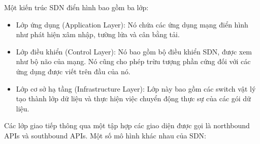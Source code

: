 \documentclass[a4paper]{article}
\begin{document}
Một kiến trúc SDN điển hình bao gồm ba lớp:
\begin{itemize}
    \item Lớp ứng dụng (Application Layer): Nó chứa các ứng dụng mạng điển hình như phát hiện xâm nhập, tường lửa và cân bằng tải.
    \item Lớp điều khiển (Control Layer): Nó bao gồm bộ điều khiển SDN, được xem như bộ não của mạng. Nó cũng cho phép trừu tượng phần cứng đối với các ứng dụng được viết trên đầu của nó.
    \item Lớp cơ sở hạ tầng (Infrastructure Layer): Lớp này bao gồm các switch vật lý tạo thành lớp dữ liệu và thực hiện việc chuyển động thực sự của các gói dữ liệu.
\end{itemize}
Các lớp giao tiếp thông qua một tập hợp các giao diện được gọi là northbound APIs và southbound APIs.
Một số mô hình khác nhau của SDN\cite{geeksforgeeks_sdn}:
\end{document}

